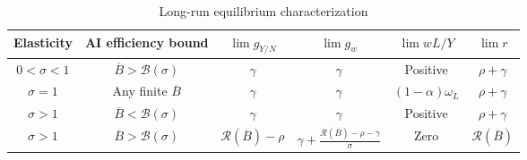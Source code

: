 \begin{table}[H]
\centering
\caption{Long-run equilibrium characterization}
\label{tab:rewrite-finite-existence}
\small
\begin{tabular}{@{}cccccc@{}}
\toprule
Elasticity & AI efficiency bound & $\lim g_{Y/N}$ & $\lim g_w$ & $\lim wL/Y$ & $\lim r$ \\
\midrule
$0<\sigma<1$ & $\overline B>\mathcal B(\sigma)$ & $\gamma$ & $\gamma$ & Positive & $\rho+\gamma$ \\
$\sigma=1$ & Any finite $\overline B$ & $\gamma$ & $\gamma$ & $(1-\alpha)\omega_L$ & $\rho+\gamma$ \\
$\sigma>1$ & $\overline B<\mathcal B(\sigma)$ & $\gamma$ & $\gamma$ & Positive & $\rho+\gamma$ \\
$\sigma>1$ & $\overline B>\mathcal B(\sigma)$ & $\mathcal R(\overline B) -\rho$ & $\gamma+\frac{\mathcal R(\overline B)-\rho-\gamma}{\sigma}$ & Zero & $\mathcal R(\overline B)$ \\
\bottomrule
\end{tabular}
\end{table}




